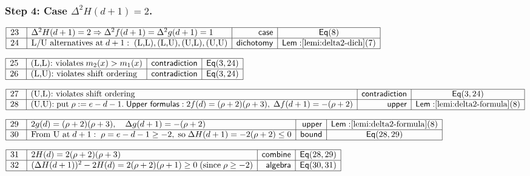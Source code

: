 \documentclass[11pt,reqno]{amsart}
\begin{document}
\subsubsection*{Step 4: Case $\Delta^{2}H(d+1)=2$.}

\noindent$%
\begin{array}{|m{0.5cm}|l|r|c|}
\hline
23 & \Delta^{2}H(d+1)=2\Rightarrow\Delta^{2}f(d+1)=\Delta^{2}g(d+1)=1 & 
\mathsf{case} & \mathsf{Eq}(8) \\ \hline
24 & \text{L/U\ alternatives at}\;d+1:\;\text{(L,L)},\text{(L,U)},\text{(U,L)%
},\text{(U,U)} & \mathsf{dichotomy} & \mathsf{Lem:}\ref{lemi:delta2-dich}(7)
\\ \hline
\end{array}%
$

\nointerlineskip\noindent$%
\begin{array}{|m{0.5cm}|l|r|c|}
\hline
25 & \text{(L,L):\ violates}\;m_{2}(x)>m_{1}(x) & \mathsf{contradiction} & 
\mathsf{Eq}(3,24) \\ \hline
26 & \text{(L,U):\ violates\ shift\ ordering} & \mathsf{contradiction} & 
\mathsf{Eq}(3,24) \\ \hline
\end{array}%
$

\nointerlineskip\noindent$%
\begin{array}{|m{0.5cm}|l|r|c|}
\hline
27 & \text{(U,L):\ violates\ shift\ ordering} & \mathsf{contradiction} & 
\mathsf{Eq}(3,24) \\ \hline
28 & \text{(U,U):\;put}\;\rho:=e-d-1.\;\mathsf{Upper\ formulas:}%
\;2f(d)=(\rho+2)(\rho+3),\;\Delta f(d+1)=-(\rho+2) & \mathsf{upper} & 
\mathsf{Lem:}\ref{lemi:delta2-formula}(8) \\ \hline
\end{array}%
$

\nointerlineskip\noindent$%
\begin{array}{|m{0.5cm}|l|r|c|}
\hline
29 & 2g(d)=(\rho+2)(\rho+3),\quad\Delta g(d+1)=-(\rho+2) & \mathsf{upper} & 
\mathsf{Lem:}\ref{lemi:delta2-formula}(8) \\ \hline
30 & \text{From U at}\;d+1:\;\rho=e-d-1\ge-2,\;\text{so}\;\Delta
H(d+1)=-2(\rho+2)\le0 & \mathsf{bound} & \mathsf{Eq}(28,29) \\ \hline
\end{array}%
$

\nointerlineskip\noindent$%
\begin{array}{|m{0.5cm}|l|r|c|}
\hline
31 & 2H(d)=2(\rho+2)(\rho+3) & \mathsf{combine} & \mathsf{Eq}(28,29) \\ 
\hline
32 & (\Delta H(d+1))^{2}-2H(d)=2(\rho+2)(\rho+1)\ge0\;\text{(since}%
\;\rho\ge-2) & \mathsf{algebra} & \mathsf{Eq}(30,31) \\ \hline
\end{array}%
$
\end{document}
